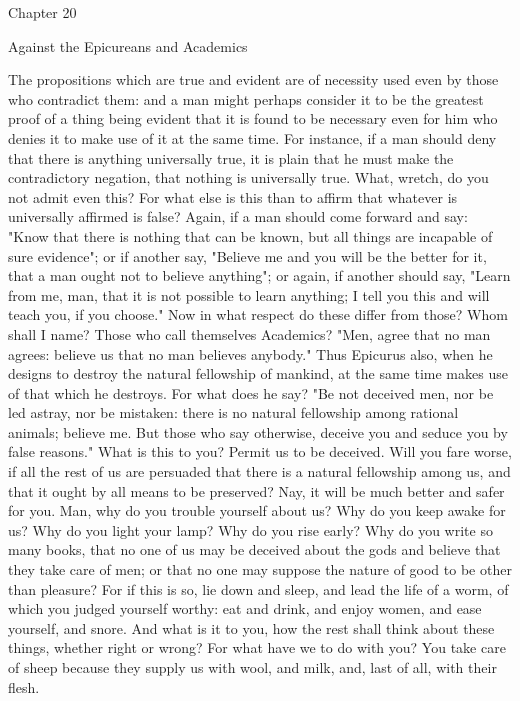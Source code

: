 \documentclass[a4paper]{article}
\begin{document}
Chapter 20

Against the Epicureans and Academics

    The propositions which are true and evident are of necessity used even by
those who contradict them: and a man might perhaps consider it to be the
greatest proof of a thing being evident that it is found to be necessary even
for him who denies it to make use of it at the same time. For instance, if a
man should deny that there is anything universally true, it is plain that he
must make the contradictory negation, that nothing is universally true. What,
wretch, do you not admit even this? For what else is this than to affirm that
whatever is universally affirmed is false? Again, if a man should come forward
and say: "Know that there is nothing that can be known, but all things are
incapable of sure evidence"; or if another say, "Believe me and you will be the
better for it, that a man ought not to believe anything"; or again, if another
should say, "Learn from me, man, that it is not possible to learn anything; I
tell you this and will teach you, if you choose." Now in what respect do these
differ from those? Whom shall I name? Those who call themselves Academics?
"Men, agree that no man agrees: believe us that no man believes anybody."
    Thus Epicurus also, when he designs to destroy the natural fellowship of
mankind, at the same time makes use of that which he destroys. For what does he
say? "Be not deceived men, nor be led astray, nor be mistaken: there is no
natural fellowship among rational animals; believe me. But those who say
otherwise, deceive you and seduce you by false reasons." What is this to you?
Permit us to be deceived. Will you fare worse, if all the rest of us are
persuaded that there is a natural fellowship among us, and that it ought by all
means to be preserved? Nay, it will be much better and safer for you. Man, why
do you trouble yourself about us? Why do you keep awake for us? Why do you
light your lamp? Why do you rise early? Why do you write so many books, that no
one of us may be deceived about the gods and believe that they take care of
men; or that no one may suppose the nature of good to be other than pleasure?
For if this is so, lie down and sleep, and lead the life of a worm, of which
you judged yourself worthy: eat and drink, and enjoy women, and ease yourself,
and snore. And what is it to you, how the rest shall think about these things,
whether right or wrong? For what have we to do with you? You take care of sheep
because they supply us with wool, and milk, and, last of all, with their flesh.
\end{document}
